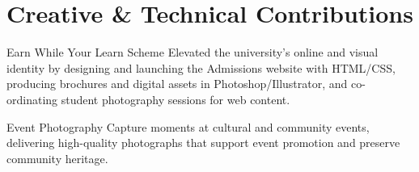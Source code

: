 \vspace{-1em}
\section{Creative \& Technical Contributions}
\begin{sectionContainer}
	{Earn While Your Learn Scheme} {Elevated the university's online and visual identity} {by designing and launching the Admissions website with HTML/CSS, producing brochures and digital assets in Photoshop/Illustrator, and co-ordinating student photography sessions for web content.}
\end{sectionContainer}

\begin{sectionContainer}
	{Event Photography} {} {Capture moments at cultural and community events, delivering high-quality photographs that support event promotion and preserve community heritage.}
\end{sectionContainer}

\nopagebreak[4]